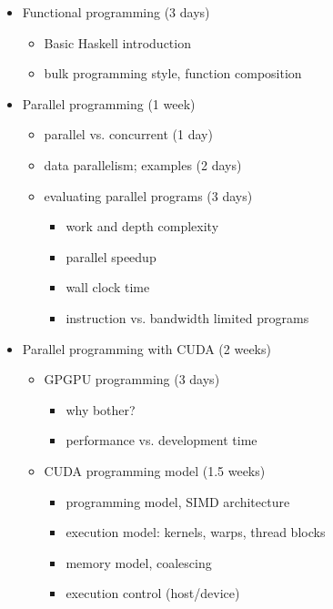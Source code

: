 \begin{itemize}
\item Functional programming (3 days)
    \begin{itemize}
        \item Basic Haskell introduction
        \item bulk programming style, function composition
    \end{itemize}

\item Parallel programming (1 week)
    \begin{itemize}
        \item parallel vs. concurrent (1 day)
        \item data parallelism; examples (2 days)
        \item evaluating parallel programs (3 days)
            \begin{itemize}
                \item work and depth complexity
                \item parallel speedup
                \item wall clock time
                \item instruction vs. bandwidth limited programs
            \end{itemize}
    \end{itemize}

\item Parallel programming with CUDA (2 weeks)
    \begin{itemize}
        \item GPGPU programming (3 days)
            \begin{itemize}
                \item why bother?
                \item performance vs. development time
            \end{itemize}
        \item CUDA programming model (1.5 weeks)
            \begin{itemize}
                \item programming model, SIMD architecture
                \item execution model: kernels, warps, thread blocks
                \item memory model, coalescing
                \item execution control (host/device)
            \end{itemize}
    \end{itemize}


\end{itemize}

